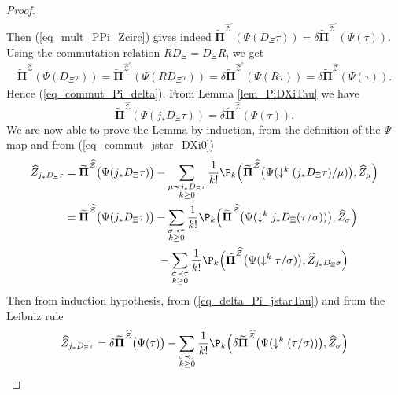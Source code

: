 \documentclass[11pt]{preprint}
\newcommand{\mcZ}{\mathcal{Z}}
\def\PPi{\boldsymbol{\Pi}}
\def\eqref#1{(\ref{#1})}
\begin{document}
\begin{proof}
\begin{align*}
\end{align*}
Then \eqref{eq_mult_PPi_Zcirc} gives indeed $\widetilde{\PPi}^{\widehat{\mcZ}^\circ}(\Psi(D_\Xi\tau)) = \delta \widetilde{\PPi}^{\widehat{\mcZ}^\circ}( \Psi(\tau)  )$.
Using the commutation relation $RD_\Xi=D_\Xi R$, we get
\begin{align*}
	\widetilde{\PPi}^{\widehat{\mcZ}}(\Psi(D_\Xi\tau)) =
	\widetilde{\PPi}^{\widehat{\mcZ}^\circ}(\Psi(RD_\Xi\tau)) =\delta \widetilde{\PPi}^{\widehat{\mcZ}^\circ}( \Psi(R\tau)  )  = \delta \widetilde{\PPi}^{\widehat{\mcZ}}( \Psi(\tau)  ).
\end{align*}
Hence \eqref{eq_commut_Pi_delta}. From Lemma \ref{lem_PiDXiTau} we have
\begin{equation}\label{eq_delta_Pi_jstarTau}
\widetilde{\PPi}^{\widehat{\mcZ}}(\Psi(j_*D_\Xi\tau)) =\delta \widetilde{\PPi}^{\widehat{\mcZ}}( \Psi(\tau)  ).
\end{equation}
We are now able to prove the Lemma by induction, from the definition of the $\Psi$ map and from \eqref{eq_commut_jstar_DXi0}
\begin{align*}
	\widehat{Z}_{j_*D_\Xi\tau} &= \widetilde{\PPi}^{\widehat{\mcZ}}\big(\Psi(j_*D_\Xi\tau)\big)-\sum_{\substack{\mu\prec j_*D_\Xi\tau\\k\geq0}} \frac{1}{k!}\P_k\Big( \widetilde{\PPi}^{\widehat{\mcZ}}\big(\Psi(\downarrow^k (j_*D_\Xi\tau)/\mu)\big) , \widehat{Z}_\mu \Big)
	\\
	&= \widetilde{\PPi}^{\widehat{\mcZ}}\big(\Psi(j_*D_\Xi\tau)\big)-\sum_{\substack{\sigma\prec\tau\\ k \geq0}} \frac{1}{k!}\P_k\Big( \widetilde{\PPi}^{\widehat{\mcZ}}\big(\Psi(\downarrow^k j_*D_\Xi(\tau/\sigma))\big) , \widehat{Z}_\sigma \Big)
	\\
	&\hspace{3cm}-\sum_{\substack{\sigma\prec\tau\\ k \geq0}} \frac{1}{k!}\P_k\Big( \widetilde{\PPi}^{\widehat{\mcZ}}\big(\Psi(\downarrow^k \tau/\sigma)\big) , \widehat{Z}_{j_*D_\Xi\sigma}\Big)
\end{align*}
Then from induction hypothesis, from \eqref{eq_delta_Pi_jstarTau} and from the Leibniz rule
\begin{align*}
	\widehat{Z}_{j_*D_\Xi\tau} &= \delta\widetilde{\PPi}^{\widehat{\mcZ}}\big(\Psi(\tau)\big)-\sum_{\substack{\sigma\prec\tau\\ k \geq0}} \frac{1}{k!}\P_k\Big( \delta\widetilde{\PPi}^{\widehat{\mcZ}}\big(\Psi(\downarrow^k(\tau/\sigma))\big) , \widehat{Z}_\sigma \Big)
	\\

\end{align*}
\end{proof}
\end{document}

